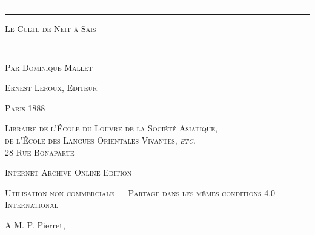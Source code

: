 \documentclass[letterpaper,twocolumn,openany,nodeprecatedcode]{dndbook}
\begin{document}
\begin{titlepage} %
	\centering %

	
	\rule{\textwidth}{1.6pt}\vspace*{-\baselineskip}\vspace*{2pt} %
	\rule{\textwidth}{0.4pt} %
	
	\vspace{1\baselineskip} %
	
	{\scshape\Huge Le Culte de Neit à Saïs}
	
	\vspace{1\baselineskip} %

	\rule{\textwidth}{0.4pt}\vspace*{-\baselineskip}\vspace{3.2pt} %
	\rule{\textwidth}{1.6pt} %
	
	\vspace{1\baselineskip} %
	
	
	{\scshape \Large Par Dominique Mallet} %
	
	\vspace*{1\baselineskip} %
	
        {\scshape\scriptsize Ernest Leroux, Editeur} %
    
        \vspace*{\fill}

	\vspace{1\baselineskip}

	{\small\scshape Paris 1888}
	
	{\small\scshape{Libraire de l'École du Louvre de la Société Asiatique,\\ de l'École des Langues Orientales Vivantes, \emph{etc.} \\ 28 Rue Bonaparte}}
	
	\vspace{0.5\baselineskip} %

        \scshape Internet Archive Online Edition  %
	
	{\scshape\small Utilisation non commerciale --- Partage dans les mêmes conditions 4.0 International} %
\end{titlepage}
\setlength{\parskip}{1mm plus1mm minus1mm}
\clearpage
\tableofcontents
\clearpage
\mainmatter%
\vspace*{\fill}
A M. P. Pierret,
\end{document}
